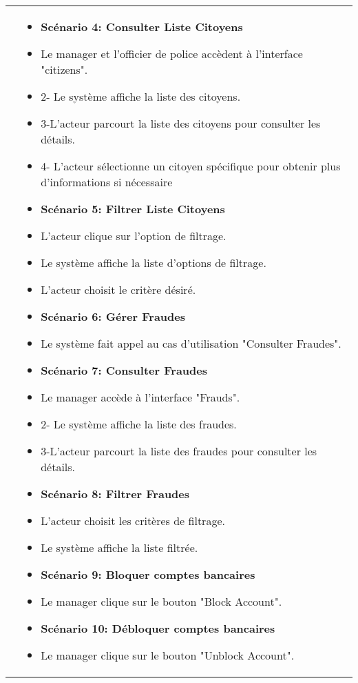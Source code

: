 \begin{longtable}{|>{\arraybackslash}p{4.2cm}|>{\arraybackslash}p{12.5cm}|}
\textbf{} &
\begin{itemize}[label=]
  \item\textbf{Scénario 4: Consulter Liste Citoyens}
  \item Le manager et l'officier de police accèdent à l'interface "citizens".
  \item{2-} Le système affiche la liste des citoyens.
  \item 3-L’acteur parcourt la liste des citoyens pour consulter les détails.
  \item 4- L’acteur sélectionne un citoyen spécifique pour obtenir plus d’informations si nécessaire
  \item\textbf{Scénario 5: Filtrer Liste Citoyens}
  \item L'acteur clique sur l'option de filtrage.
  \item Le système affiche la liste d'options de filtrage.
  \item L'acteur choisit le critère désiré.
  \item\textbf{Scénario 6: Gérer Fraudes}
  \item Le système fait appel au cas d'utilisation "Consulter Fraudes".
   \item\textbf{Scénario 7: Consulter Fraudes}
  \item Le manager accède à l'interface "Frauds".
  \item{2-} Le système affiche la liste des fraudes.
  \item 3-L’acteur parcourt la liste des fraudes pour consulter les détails.
   \item\textbf{Scénario 8: Filtrer Fraudes}
   \item L'acteur choisit les critères de filtrage.
    \item Le système affiche la liste filtrée.

   \item\textbf{Scénario 9: Bloquer comptes bancaires}
  \item Le manager clique sur le bouton "Block Account".
   \item\textbf{Scénario 10: Débloquer comptes bancaires}
  \item Le manager clique sur le bouton "Unblock Account".
\end{itemize} \\


\end{longtable}
